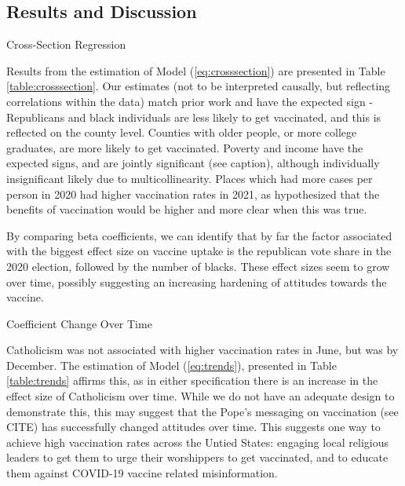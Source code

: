 \documentclass[12pt]{article}
\begin{document}
\begin{spacing}{1.5}
		
		\section{Results and Discussion}
		
		\begin{table}
			\centering
			\caption{Cross-Section Regression}
			\centerline{}
			\label{table:crosssection}
		\end{table}
		
		Results from the estimation of Model (\ref{eq:crosssection}) are presented in Table \ref{table:crosssection}. Our estimates (not to be interpreted causally, but reflecting correlations within the data) match prior work and have the expected sign - Republicans and black individuals are less likely to get vaccinated, and this is reflected on the county level. Counties with older people, or more college graduates, are more likely to get vaccinated. Poverty and income have the expected signs, and are jointly significant (see caption), although individually insignificant likely due to multicollinearity. Places which had more cases per person in 2020 had higher vaccination rates in 2021, as hypothesized that the benefits of vaccination would be higher and more clear when this was true.
		
		By comparing beta coefficients, we can identify that by far the factor associated with the biggest effect size on vaccine uptake is the republican vote share in the 2020 election, followed by the number of blacks. These effect sizes seem to grow over time, possibly suggesting an increasing hardening of attitudes towards the vaccine.
		
		\begin{table}
			\centering
			\caption{Coefficient Change Over Time}
			
			\label{table:trends}
		\end{table}
		
		Catholicism was not associated with higher vaccination rates in June, but was by December. The estimation of Model (\ref{eq:trends}), presented in Table \ref{table:trends} affirms this, as in either specification there is an increase in the effect size of Catholicism over time. While we do not have an adequate design to demonstrate this, this may suggest that the Pope's messaging on vaccination (see CITE) has successfully changed attitudes over time. This suggests one way to achieve high vaccination rates across the Untied States: engaging local religious leaders to get them to urge their worshippers to get vaccinated, and to educate them against COVID-19 vaccine related misinformation.
		

\end{spacing}
\end{document}
